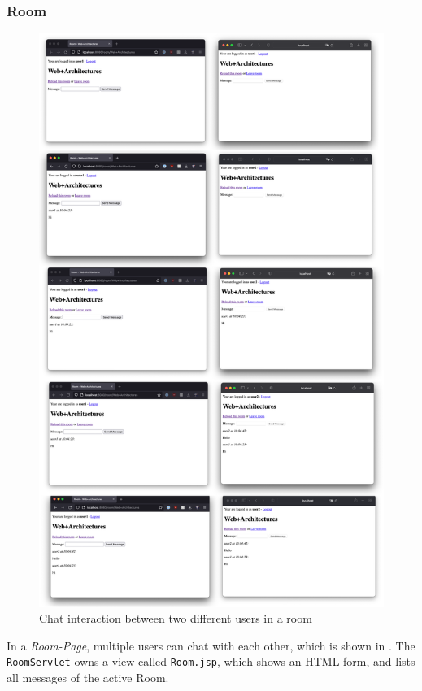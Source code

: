 \subsubsection{Room}\label{subsubsec:03_impl_servlets_room}
\begin{figure}[h]
\centering
\includegraphics[scale=0.25]{images/03_impl/room/chat_all_steps}
\caption{Chat interaction between two different users in a room}
\label{fig:03_impl_servlets_admin_chat}
\end{figure}
In a \textit{Room-Page}, multiple users can chat with each other, which is shown in .
The \texttt{RoomServlet} owns a view called \texttt{Room.jsp}, which shows an HTML form, and lists all messages of the active Room.

